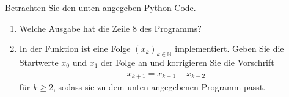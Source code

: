 Betrachten Sie den unten angegeben Python-Code.
\begin{enumerate}
	\item Welche Ausgabe hat die Zeile 8 des Programms?
	\item In der Funktion ist eine Folge $(x_k)_{k \in \mathbb{N}}$ implementiert. Geben Sie die Startwerte $x_0$ und $x_1$ der Folge an und korrigieren Sie die Vorschrift
	\begin{align*}
		x_{k+1} = x_{k-1} + x_{k-2}
	\end{align*}
	für $k \geq 2$, sodass sie zu dem unten angegebenen Programm passt.
\end{enumerate}

